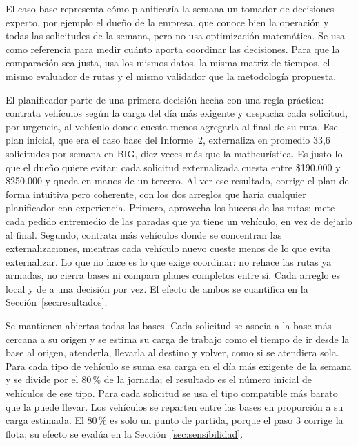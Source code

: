 El caso base representa cómo planificaría la semana un tomador de decisiones experto, por ejemplo el dueño de la empresa, que conoce bien la operación y todas las solicitudes de la semana, pero no usa optimización matemática. Se usa como referencia para medir cuánto aporta coordinar las decisiones. Para que la comparación sea justa, usa los mismos datos, la misma matriz de tiempos, el mismo evaluador de rutas y el mismo validador que la metodología propuesta.

 El planificador parte de una primera decisión hecha con una regla práctica: contrata vehículos según la carga del día más exigente y despacha cada solicitud, por urgencia, al vehículo donde cuesta menos agregarla al final de su ruta. Ese plan inicial, que era el caso base del Informe~2, externaliza en promedio 33,6 solicitudes por semana en BIG, diez veces más que la matheurística. Es justo lo que el dueño quiere evitar: cada solicitud externalizada cuesta entre \$190.000 y \$250.000 y queda en manos de un tercero. Al ver ese resultado, corrige el plan de forma intuitiva pero coherente, con los dos arreglos que haría cualquier planificador con experiencia. Primero, aprovecha los huecos de las rutas: mete cada pedido entremedio de las paradas que ya tiene un vehículo, en vez de dejarlo al final. Segundo, contrata más vehículos donde se concentran las externalizaciones, mientras cada vehículo nuevo cueste menos de lo que evita externalizar. Lo que no hace es lo que exige coordinar: no rehace las rutas ya armadas, no cierra bases ni compara planes completos entre sí. Cada arreglo es local y de a una decisión por vez. El efecto de ambos se cuantifica en la Sección~\ref{sec:resultados}.

 Se mantienen abiertas todas las bases. Cada solicitud se asocia a la base más cercana a su origen y se estima su carga de trabajo como el tiempo de ir desde la base al origen, atenderla, llevarla al destino y volver, como si se atendiera sola. Para cada tipo de vehículo se suma esa carga en el día más exigente de la semana y se divide por el 80\,\% de la jornada; el resultado es el número inicial de vehículos de ese tipo. Para cada solicitud se usa el tipo compatible más barato que la puede llevar. Los vehículos se reparten entre las bases en proporción a su carga estimada. El 80\,\% es solo un punto de partida, porque el paso 3 corrige la flota; su efecto se evalúa en la Sección~\ref{sec:sensibilidad}.

